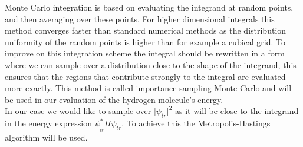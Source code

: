 Monte Carlo integration is based on evaluating the integrand at random points, and then averaging over these points. For higher dimensional integrals this method converges faster than standard numerical methods as the distribution uniformity of the random points is higher than for example a cubical grid. To improve on this integration scheme the integral should be rewritten in a form where we can sample over a distribution close to the shape of the integrand, this ensures that the regions that contribute strongly to the integral are evaluated more exactly. This method is called importance sampling Monte Carlo and will be used in our evaluation of the hydrogen molecule's energy. \\
In our case we would like to sample over  $|{\psi _{tr}}{|^2}$ as it will be close to the integrand in the energy expression $\psi _{_{tr}}^*H{\psi _{tr}}$. To achieve this the Metropolis-Hastings algorithm will be used.